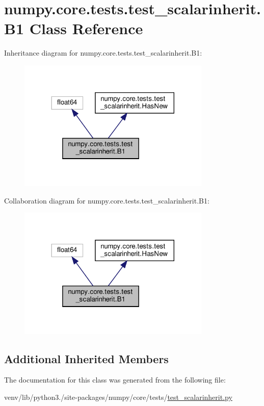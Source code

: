 \hypertarget{classnumpy_1_1core_1_1tests_1_1test__scalarinherit_1_1B1}{}\section{numpy.\+core.\+tests.\+test\+\_\+scalarinherit.\+B1 Class Reference}
\label{classnumpy_1_1core_1_1tests_1_1test__scalarinherit_1_1B1}


Inheritance diagram for numpy.\+core.\+tests.\+test\+\_\+scalarinherit.\+B1\+:
\nopagebreak
\begin{figure}[H]
\begin{center}
\leavevmode
\includegraphics[width=260pt]{classnumpy_1_1core_1_1tests_1_1test__scalarinherit_1_1B1__inherit__graph}
\end{center}
\end{figure}


Collaboration diagram for numpy.\+core.\+tests.\+test\+\_\+scalarinherit.\+B1\+:
\nopagebreak
\begin{figure}[H]
\begin{center}
\leavevmode
\includegraphics[width=260pt]{classnumpy_1_1core_1_1tests_1_1test__scalarinherit_1_1B1__coll__graph}
\end{center}
\end{figure}
\subsection*{Additional Inherited Members}


The documentation for this class was generated from the following file\+:\begin{DoxyCompactItemize}
\item 
venv/lib/python3./site-\/packages/numpy/core/tests/\hyperlink{test__scalarinherit_8py}{test\+\_\+scalarinherit.\+py}\end{DoxyCompactItemize}
